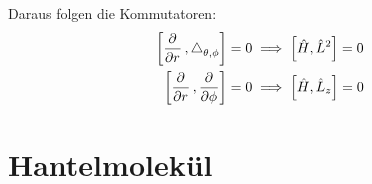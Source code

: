 Daraus folgen die Kommutatoren:
\begin{align*}
	\sbr{\dpd{}r, \laplace_{\theta,\phi}} = 0
	&\implies
	\sbr{\hat H, \hat L^2} = 0 \\
	\sbr{\dpd{}r, \dpd{}\phi} = 0
	&\implies
	\sbr{\hat H, \hat L_z} = 0
\end{align*}


\section{Hantelmolekül}

\fehlt


\IfFileExists{\bibliographyfile}{
}{}



